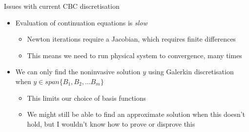 \documentclass[presentation]{beamer}
\begin{document}
\begin{frame}[label={sec:org6a1ff6c}]{Issues with current CBC discretisation}
\begin{itemize}
\item Evaluation of continuation equations is \emph{slow}
\begin{itemize}
\item Newton iterations require a Jacobian, which requires finite differences
\item This means we need to run physical system to convergence, many times
\end{itemize}
\end{itemize}
\vfill
\begin{itemize}
\item We can only find the noninvasive solution \(y\) using Galerkin discretisation when \(y\in span\{B_1, B_2, \dots B_m\}\)
\begin{itemize}
\item This limits our choice of basis functions
\item We might still be able to find an approximate solution when this doesn't hold, but I wouldn't know how to prove or disprove this
\end{itemize}
\end{itemize}
\end{frame}
\end{document}
